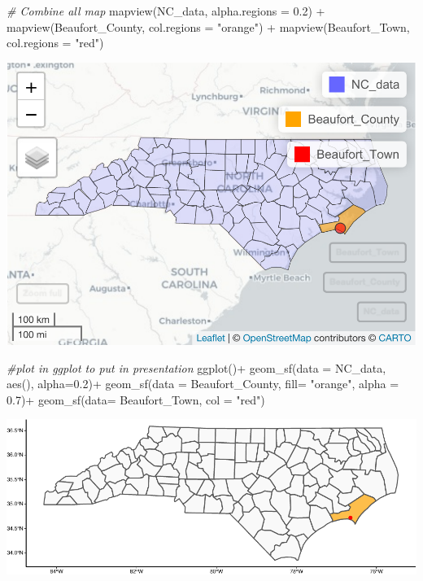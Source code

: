 \documentclass[
  12pt,
]{article}
\newenvironment{Shaded}{\begin{snugshade}}{\end{snugshade}}
\newcommand{\AttributeTok}[1]{\textcolor[rgb]{0.77,0.63,0.00}{#1}}
\newcommand{\CommentTok}[1]{\textcolor[rgb]{0.56,0.35,0.01}{\textit{#1}}}
\newcommand{\FloatTok}[1]{\textcolor[rgb]{0.00,0.00,0.81}{#1}}
\newcommand{\FunctionTok}[1]{\textcolor[rgb]{0.00,0.00,0.00}{#1}}
\newcommand{\NormalTok}[1]{#1}
\newcommand{\SpecialCharTok}[1]{\textcolor[rgb]{0.00,0.00,0.00}{#1}}
\newcommand{\StringTok}[1]{\textcolor[rgb]{0.31,0.60,0.02}{#1}}
\begin{document}
\begin{Shaded}
\begin{Highlighting}[]
\CommentTok{\# Combine all map }
\FunctionTok{mapview}\NormalTok{(NC\_data, }\AttributeTok{alpha.regions =} \FloatTok{0.2}\NormalTok{) }\SpecialCharTok{+}
  \FunctionTok{mapview}\NormalTok{(Beaufort\_County, }\AttributeTok{col.regions =} \StringTok{"orange"}\NormalTok{) }\SpecialCharTok{+}
  \FunctionTok{mapview}\NormalTok{(Beaufort\_Town, }\AttributeTok{col.regions =} \StringTok{"red"}\NormalTok{)}
\end{Highlighting}
\end{Shaded}

\includegraphics{Project_Template_TLK_files/figure-latex/Map of Beaufort-5.pdf}

\begin{Shaded}
\begin{Highlighting}[]
\CommentTok{\#plot in ggplot to put in presentation }
\FunctionTok{ggplot}\NormalTok{()}\SpecialCharTok{+}
  \FunctionTok{geom\_sf}\NormalTok{(}\AttributeTok{data =}\NormalTok{ NC\_data, }\FunctionTok{aes}\NormalTok{(), }\AttributeTok{alpha=}\FloatTok{0.2}\NormalTok{)}\SpecialCharTok{+}
  \FunctionTok{geom\_sf}\NormalTok{(}\AttributeTok{data =}\NormalTok{ Beaufort\_County, }\AttributeTok{fill=} \StringTok{"orange"}\NormalTok{, }\AttributeTok{alpha =} \FloatTok{0.7}\NormalTok{)}\SpecialCharTok{+}
  \FunctionTok{geom\_sf}\NormalTok{(}\AttributeTok{data=}\NormalTok{ Beaufort\_Town, }\AttributeTok{col =} \StringTok{"red"}\NormalTok{)}
\end{Highlighting}
\end{Shaded}

\includegraphics{Project_Template_TLK_files/figure-latex/Map of Beaufort-6.pdf}
\end{document}
